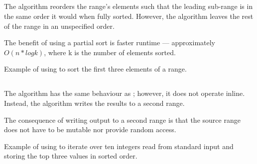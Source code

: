 \subsection{\texorpdfstring{}{\texttt{std::partial\_sort}}}

The  algorithm reorders the range's elements such that the leading sub-range is in the same order it would when fully sorted. However, the algorithm leaves the rest of the range in an unspecified order.



The benefit of using a partial sort is faster runtime — approximately $O(n*logk)$, where k is the number of elements sorted.

\begin{box-note}
\footnotesize Example of using  to sort the first three elements of a range.
\tcblower
{}
\end{box-note}

\subsection{\texorpdfstring{}{\texttt{std::partial\_sort\_copy}}}

The  algorithm has the same behaviour as ; however, it does not operate inline. Instead, the algorithm writes the results to a second range.


The consequence of writing output to a second range is that the source range does not have to be mutable nor provide random access.

\begin{box-note}
\footnotesize Example of using  to iterate over ten integers read from standard input and storing the top three values in sorted order.
\tcblower
{}
\end{box-note}

